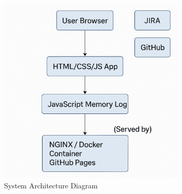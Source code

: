\documentclass[12pt]{article}
\begin{document}
\begin{figure}[h!]
\centering
\includegraphics[width=0.8\textwidth]{system_architecture_FINAL.png}
\caption{System Architecture Diagram}
\end{figure}
\end{document}
